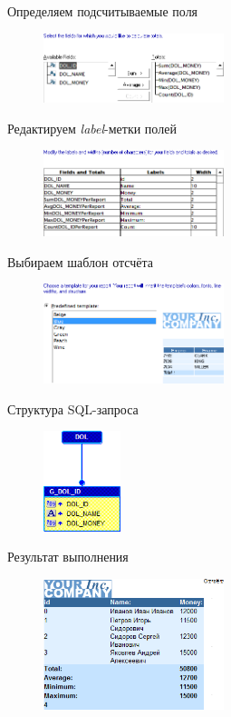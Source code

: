 \documentclass[pscyr, 12pt]{hedlab}
\begin{document}
    Определяем подсчитываемые поля
    \begin{figure}[ht!]
        \center
        \includegraphics[width=0.47\textwidth]{lab06_04}
    \end{figure}

    Редактируем \emph{label}-метки полей
    \begin{figure}[ht!]
        \center
        \includegraphics[width=0.47\textwidth]{lab06_05}
    \end{figure}

    Выбираем шаблон отсчёта
    \begin{figure}[ht!]
        \center
        \includegraphics[width=0.47\textwidth]{lab06_06}
    \end{figure}

    \pagebreak

    Структура SQL-запроса
    \begin{figure}[ht!]
        \center
        \includegraphics[width=0.2\textwidth]{lab06_08}
    \end{figure}

    Результат выполнения
    \begin{figure}[ht!]
        \center
        \includegraphics[width=0.47\textwidth]{lab06_07}
    \end{figure}
\end{document}
